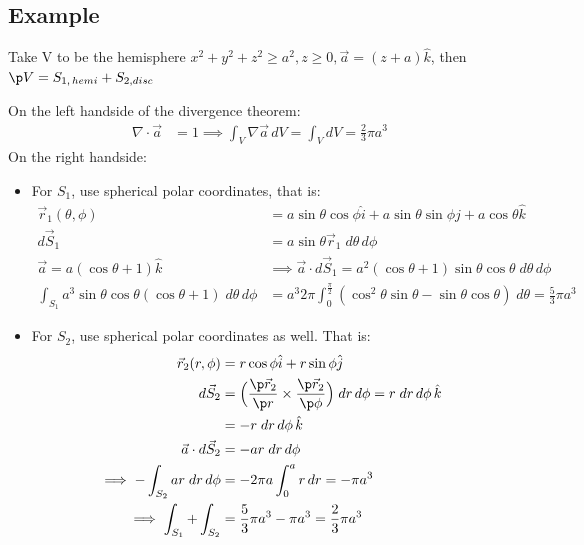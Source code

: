 \documentclass[a4paper, 11pt, normalem]{report}
\begin{document}
\subsection{Example}
Take V to be the hemisphere $x^2 + y^2 + z^2 \geq a^2, z \geq 0, \vec{a} = (z + a)\hat{k}$, then $\p V = S_{1,\,hemi} + S_{2, disc}$

On the left handside of the divergence theorem:
\begin{align*}
    \nabla \cdot \vec{a} &= 1 \implies \int_V \nabla \vec{a}\,dV = \int_V dV = \frac{2}{3}\pi a^3
\end{align*}
On the right handside:
\begin{itemize}
    \item For $S_1$, use spherical polar coordinates, that is:
            \begin{align*}
                \vec{r}_1(\theta,\phi) &= a\sin\theta\cos\phi \hat{i} + a\sin\theta\sin\phi \hat{j} + a\cos\theta \hat{k} \\
                d\vec{S}_1 &= a\sin\theta \vec{r}_1 \;d\theta\, d\phi \\
                \vec{a} = a(\cos\theta + 1)\hat{k} &\implies \vec{a} \cdot d\vec{S}_1 = a^2(\cos\theta + 1)\sin\theta\cos\theta\;d\theta\,d\phi \\
                \int_{S_1} a^3 \sin\theta\cos\theta(\cos\theta + 1)\;d\theta\,d\phi &= a^3 2\pi \int_0^{\frac{\pi}{2}} (\cos^2 \theta \sin\theta - \sin\theta\cos\theta)\;d\theta = \frac{5}{3}\pi a^3
            \end{align*}
        \item For $S_2$, use spherical polar coordinates as well. That is:
                \begin{align*}
                    \vec{r}_2(r, \phi) &= r\cos\phi \hat{i} + r\sin\phi \hat{j} \\
                    d\vec{S}_2 &= \Big(\frac{\p \vec{r}_2}{\p r} \times \frac{\p \vec{r}_2}{\p \phi}\Big)\;dr\,d\phi = r\;dr\,d\phi \,\hat{k} \\
                    &= -r\;dr\,d\phi \,\hat{k} \\
                    \vec{a} \cdot d\vec{S}_2 &= -ar\;dr\,d\phi \\
                    \implies -\int_{S_2} ar\;dr\,d\phi &= -2\pi a \int_0^a r\,dr = -\pi a^3 \\
                    \implies \int_{S_1} + \int_{S_2} &= \frac{5}{3}\pi a^3 - \pi a^3 = \frac{2}{3} \pi a^3
                \end{align*}
\end{itemize}
\end{document}
